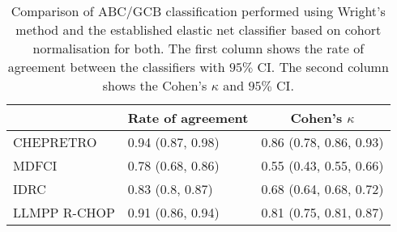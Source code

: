 \begin{table}[!tbp]
{\small
\caption{Comparison of ABC/GCB classification performed using Wright's
method and the established elastic net classifier based on cohort normalisation
for both. The first column shows the rate of agreement between the classifiers
with $95\%$ CI. The second column shows the Cohen's $\kappa$ and $95\%$ CI.\label{tab:ABCGCBclassifier}} 
\begin{center}
\begin{tabular}{lll}
\hline\hline
\multicolumn{1}{l}{}&\multicolumn{1}{c}{Rate of agreement}&\multicolumn{1}{c}{Cohen's $\kappa$}\tabularnewline
\hline
CHEPRETRO&0.94 (0.87, 0.98)&0.86 (0.78, 0.86, 0.93)\tabularnewline
MDFCI&0.78 (0.68, 0.86)&0.55 (0.43, 0.55, 0.66)\tabularnewline
IDRC&0.83 (0.8, 0.87)&0.68 (0.64, 0.68, 0.72)\tabularnewline
LLMPP R-CHOP&0.91 (0.86, 0.94)&0.81 (0.75, 0.81, 0.87)\tabularnewline
\hline
\end{tabular}\end{center}}

\end{table}
